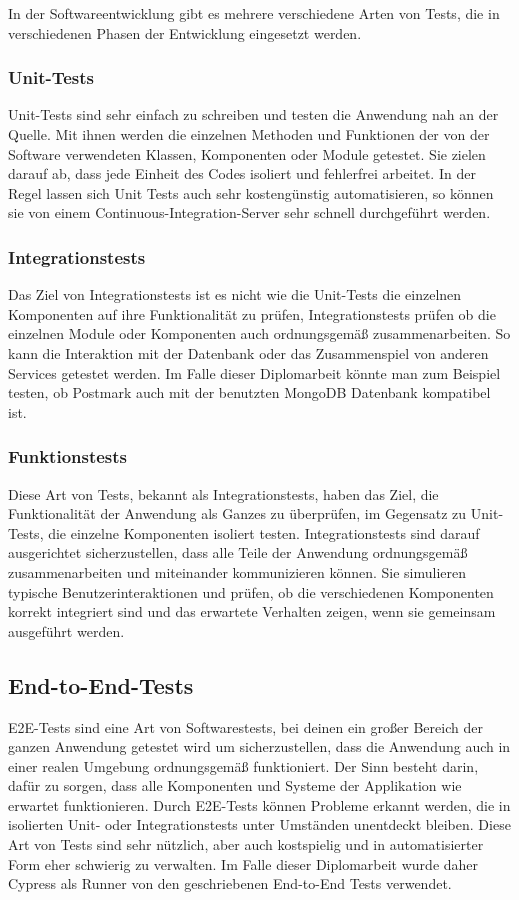 In der Softwareentwicklung gibt es mehrere verschiedene Arten von Tests, die in verschiedenen Phasen der Entwicklung eingesetzt werden.

\subsubsection{Unit-Tests}
Unit-Tests sind sehr einfach zu schreiben und testen die Anwendung nah an der Quelle. Mit ihnen werden die einzelnen Methoden und Funktionen der von der Software verwendeten Klassen, Komponenten oder Module getestet. Sie zielen darauf ab, dass jede Einheit des Codes isoliert und fehlerfrei arbeitet. In der Regel lassen sich Unit Tests auch sehr kostengünstig automatisieren, so können sie von einem Continuous-Integration-Server sehr schnell durchgeführt werden.


\subsubsection{Integrationstests}
Das Ziel von Integrationstests ist es nicht wie die Unit-Tests die einzelnen Komponenten auf ihre Funktionalität zu prüfen, Integrationstests prüfen ob die einzelnen Module oder Komponenten auch ordnungsgemäß zusammenarbeiten. So kann die Interaktion mit der Datenbank oder das Zusammenspiel von anderen Services getestet werden. Im Falle dieser Diplomarbeit könnte man zum Beispiel testen, ob Postmark auch mit der benutzten MongoDB Datenbank kompatibel ist.

\subsubsection{Funktionstests}
Diese Art von Tests, bekannt als Integrationstests, haben das Ziel, die Funktionalität der Anwendung als Ganzes zu überprüfen, im Gegensatz zu Unit-Tests, die einzelne Komponenten isoliert testen. Integrationstests sind darauf ausgerichtet sicherzustellen, dass alle Teile der Anwendung ordnungsgemäß zusammenarbeiten und miteinander kommunizieren können. Sie simulieren typische Benutzerinteraktionen und prüfen, ob die verschiedenen Komponenten korrekt integriert sind und das erwartete Verhalten zeigen, wenn sie gemeinsam ausgeführt werden.

\subsection{End-to-End-Tests}
E2E-Tests sind eine Art von Softwarestests, bei deinen ein großer Bereich der ganzen Anwendung getestet wird um sicherzustellen, dass die Anwendung auch in einer realen Umgebung ordnungsgemäß funktioniert. Der Sinn besteht darin, dafür zu sorgen, dass alle Komponenten und Systeme der Applikation wie erwartet funktionieren. Durch E2E-Tests können Probleme erkannt werden, die in isolierten Unit- oder Integrationstests unter Umständen unentdeckt bleiben. Diese Art von Tests sind sehr nützlich, aber auch kostspielig und in automatisierter Form eher schwierig zu verwalten. Im Falle dieser Diplomarbeit wurde daher Cypress als Runner von den geschriebenen End-to-End Tests verwendet.


\cite{Verschiedene_Testarten}
